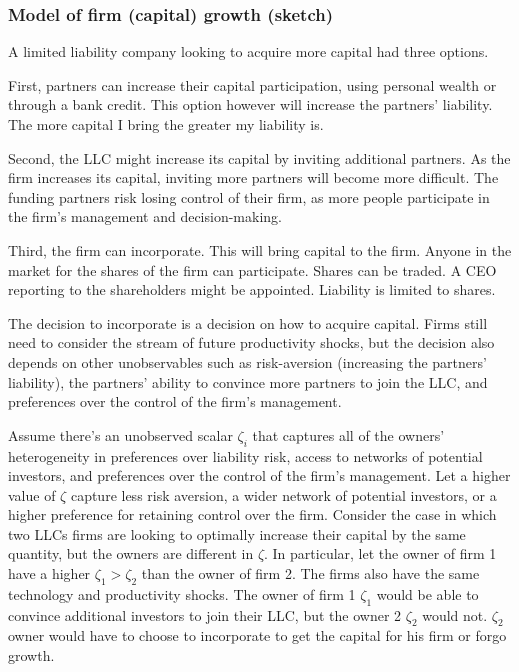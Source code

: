 \documentclass[
  12pt]{article}
\theoremstyle{definition}
\theoremstyle{remark}
\begin{document}
\subsubsection{Model of firm (capital) growth
(sketch)}\label{model-of-firm-capital-growth-sketch}

A limited liability company looking to acquire more capital had three
options.

First, partners can increase their capital participation, using personal
wealth or through a bank credit. This option however will increase the
partners' liability. The more capital I bring the greater my liability
is.

Second, the LLC might increase its capital by inviting additional
partners. As the firm increases its capital, inviting more partners will
become more difficult. The funding partners risk losing control of their
firm, as more people participate in the firm's management and
decision-making.

Third, the firm can incorporate. This will bring capital to the firm.
Anyone in the market for the shares of the firm can participate. Shares
can be traded. A CEO reporting to the shareholders might be appointed.
Liability is limited to shares.

The decision to incorporate is a decision on how to acquire capital.
Firms still need to consider the stream of future productivity shocks,
but the decision also depends on other unobservables such as
risk-aversion (increasing the partners' liability), the partners'
ability to convince more partners to join the LLC, and preferences over
the control of the firm's management.

Assume there's an unobserved scalar \(\zeta_i\) that captures all of the
owners' heterogeneity in preferences over liability risk, access to
networks of potential investors, and preferences over the control of the
firm's management. Let a higher value of \(\zeta\) capture less risk
aversion, a wider network of potential investors, or a higher preference
for retaining control over the firm. Consider the case in which two LLCs
firms are looking to optimally increase their capital by the same
quantity, but the owners are different in \(\zeta\). In particular, let
the owner of firm 1 have a higher \(\zeta_1>\zeta_2\) than the owner of
firm 2. The firms also have the same technology and productivity shocks.
The owner of firm 1 \(\zeta_1\) would be able to convince additional
investors to join their LLC, but the owner 2 \(\zeta_2\) would not.
\(\zeta_2\) owner would have to choose to incorporate to get the capital
for his firm or forgo growth.
\end{document}
